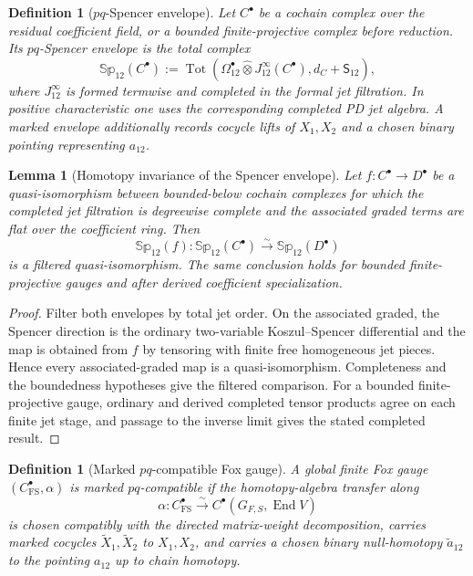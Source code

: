 \documentclass[11pt]{article}
\newtheorem{lemma}[theorem]{Lemma}
\newtheorem{definition}[theorem]{Definition}
\theoremstyle{remark}
\begin{document}
\begin{definition}[$pq$-Spencer envelope]\label{P1L-def:pq-spencer-envelope}
Let $C^\bullet$ be a cochain complex over the residual coefficient field, or a
bounded finite-projective complex before reduction.  Its \emph{$pq$-Spencer
envelope} is the total complex
\[
 \mathbb{Sp}_{12}(C^\bullet)
 :=
 \operatorname{Tot}\!\left(
   \Omega^\bullet_{12}\widehat\otimes
   J^\infty_{12}(C^\bullet),
   d_C+\mathsf S_{12}
 \right),
\]
where $J^\infty_{12}$ is formed termwise and completed in the formal jet
filtration.  In positive characteristic one uses the corresponding completed
PD jet algebra.  A marked envelope additionally records cocycle lifts of
$X_1,X_2$ and a chosen binary pointing representing $a_{12}$.
\end{definition}

\begin{lemma}[Homotopy invariance of the Spencer envelope]
\label{P1L-lem:pq-spencer-envelope-invariance}
Let $f:C^\bullet\to D^\bullet$ be a quasi-isomorphism between bounded-below
cochain complexes for which the completed jet filtration is degreewise
complete and the associated graded terms are flat over the coefficient ring.
Then
\[
 \mathbb{Sp}_{12}(f):
 \mathbb{Sp}_{12}(C^\bullet)
 \xrightarrow{\sim}
 \mathbb{Sp}_{12}(D^\bullet)
\]
is a filtered quasi-isomorphism.  The same conclusion holds for bounded
finite-projective gauges and after derived coefficient specialization.
\end{lemma}

\begin{proof}
Filter both envelopes by total jet order.  On the associated graded, the
Spencer direction is the ordinary two-variable Koszul--Spencer differential
and the map is obtained from $f$ by tensoring with finite free homogeneous jet
pieces.  Hence every associated-graded map is a quasi-isomorphism.  Completeness
and the boundedness hypotheses give the filtered comparison.  For a bounded
finite-projective gauge, ordinary and derived completed tensor products agree
on each finite jet stage, and passage to the inverse limit gives the stated
completed result.
\end{proof}

\begin{definition}[Marked $pq$-compatible Fox gauge]
\label{P1L-def:pq-compatible-fox-gauge}
A global finite Fox gauge $(C^\bullet_{\mathrm{FS}},\alpha)$ is
\emph{marked $pq$-compatible} if the homotopy-algebra transfer along
\[
 \alpha:C^\bullet_{\mathrm{FS}}
 \xrightarrow{\sim}
 C^\bullet(G_{F,S},\operatorname{End}V)
\]
is chosen compatibly with the directed matrix-weight decomposition, carries
marked cocycles $\widetilde X_1,\widetilde X_2$ to $X_1,X_2$, and carries a
chosen binary null-homotopy $\widetilde a_{12}$ to the pointing $a_{12}$ up to
chain homotopy.
\end{definition}
\end{document}
